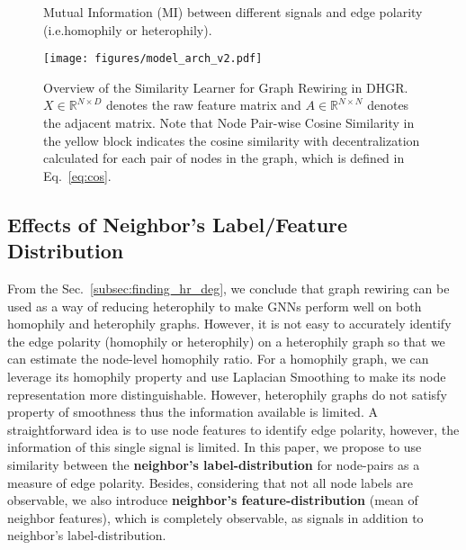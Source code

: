 \documentclass[sigconf]{acmart}
\begin{document}
	\begin{figure}[h]
		\begin{minipage}[t]{0.33\linewidth}
			\centering
		\end{minipage}\begin{minipage}[t]{0.33\linewidth}
			\centering
		\end{minipage}
		\begin{minipage}[t]{0.33\linewidth}
			\centering
		\end{minipage}
		\caption{Mutual Information (MI) between different signals and edge polarity (i.e.homophily or heterophily).}
		
		\label{fig:mi_valid}
	\end{figure}
	\begin{figure*}[h]
		\centering
		\texttt{[image: figures/model\_arch\_v2.pdf]}
		\caption{Overview of the Similarity Learner for Graph Rewiring in DHGR. $X\in\mathbb{R}^{N\times D}$ denotes the raw feature matrix and $A\in\mathbb{R}^{N\times N}$ denotes the adjacent matrix. Note that Node Pair-wise Cosine Similarity in the yellow block indicates the cosine similarity with decentralization calculated for each pair of nodes in the graph, which is defined in Eq.~\ref{eq:cos}.}
		\label{fig:model}
\end{figure*}
	
    \subsection{Effects of Neighbor's Label/Feature Distribution}
	\label{subsec:finding_mi}
	From the Sec.~\ref{subsec:finding_hr_deg}, we conclude that graph rewiring can be used as a way of reducing heterophily to make GNNs perform well on both homophily and heterophily graphs. However, it is not easy to accurately identify the edge polarity (homophily or heterophily) on a heterophily graph so that we can estimate the node-level homophily ratio. For a homophily graph, we can leverage its homophily property and use Laplacian Smoothing \cite{smooth1, smooth2} to make its node representation more distinguishable. However, heterophily graphs do not satisfy property of smoothness thus the information available is limited. A straightforward idea is to use node features to identify edge polarity, however, the information of this single signal is limited.
	In this paper, we propose to use similarity between the \textbf{neighbor's label-distribution} for node-pairs as a measure of edge polarity. Besides, considering that not all node labels are observable, we also introduce \textbf{neighbor's feature-distribution} (mean of neighbor features), which is completely observable, as signals in addition to neighbor's label-distribution. 
	
\end{document}

